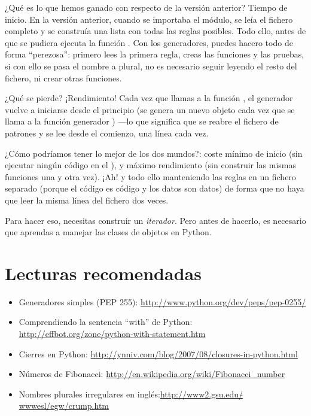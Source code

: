 ¿Qué es lo que hemos ganado con respecto de la versión anterior? Tiempo de inicio. En la versión anterior, cuando se importaba el módulo, se leía el fichero completo y se construía una lista con todas las reglas posibles. Todo ello, antes de que se pudiera ejecuta la función . Con los generadores, puedes hacero todo de forma ``perezosa'': primero lees la primera regla, creas las funciones y las pruebas, si con ello se pasa el nombre a plural, no es necesario seguir leyendo el resto del fichero, ni crear otras funciones.

¿Qué se pierde? ¡Rendimiento! Cada vez que llamas a la función , el generador  vuelve a iniciarse desde el principio (se genera un nuevo objeto cada vez que se llama a la función generador ) ---lo que significa que se reabre el fichero de patrones y se lee desde el comienzo, una línea cada vez.

¿Cómo podríamos tener lo mejor de los dos mundos?: coste mínimo de inicio (sin ejecutar ningún código en el ), y máximo rendimiento (sin construir las mismas funciones una y otra vez). ¡Ah! y todo ello manteniendo las reglas en un fichero separado (porque el código es código y los datos son datos) de forma que no haya que leer la misma línea del fichero dos veces.

Para hacer eso, necesitas construir un \emph{iterador}. Pero antes de hacerlo, es necesario que aprendas a manejar las clases de objetos en Python.

\section{Lecturas recomendadas}

\begin{itemize}

\item Generadores simples (PEP 255): \href{http://www.python.org/dev/peps/pep-0255/}{http://www.python.org/dev/peps/pep-0255/}

\item Comprendiendo la sentencia ``with'' de Python: \href{http://effbot.org/zone/python-with-statement.htm}{http://effbot.org/zone/python-with-statement.htm}

\item Cierres en Python: \href{http://ynniv.com/blog/2007/08/closures-in-python.html}{http://ynniv.com/blog/2007/08/closures-in-python.html}

\item Números de Fibonacci: \href{http://en.wikipedia.org/wiki/Fibonacci\_number}{http://en.wikipedia.org/wiki/Fibonacci\_number}

\item Nombres plurales irregulares en inglés:\newline \href{http://www2.gsu.edu/~wwwesl/egw/crump.htm}{http://www2.gsu.edu/$\tilde{ }$wwwesl/egw/crump.htm}

\end{itemize}

